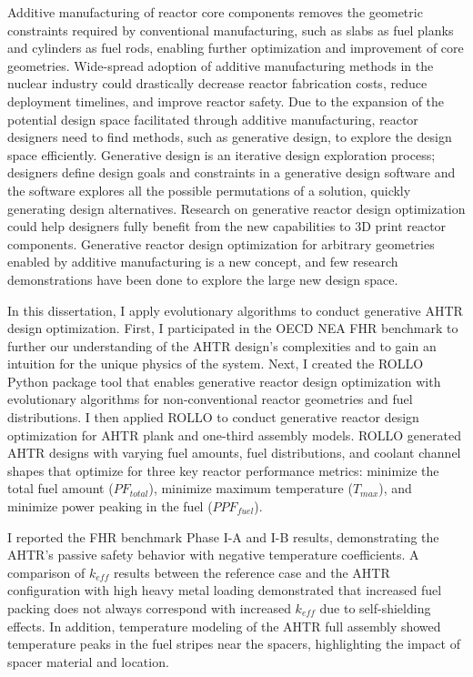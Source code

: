 

Additive manufacturing of reactor core components removes the geometric constraints
required by conventional manufacturing, such as slabs as fuel planks and cylinders 
as fuel rods, enabling further optimization and improvement of core geometries. 
Wide-spread adoption of additive manufacturing methods in the nuclear industry 
could drastically decrease reactor fabrication costs, reduce deployment timelines, 
and improve reactor safety. 
Due to the expansion of the potential design space facilitated through additive 
manufacturing, reactor designers need to find methods, such as generative 
design, to explore the design space efficiently.
Generative design is an iterative design exploration process; designers define design 
goals and constraints in a generative design software and the software explores 
all the possible permutations of a solution, quickly generating design alternatives. 
Research on generative reactor design optimization could help designers fully benefit 
from the new capabilities to 3D print reactor components. 
Generative reactor design optimization for arbitrary geometries enabled by additive 
manufacturing is a new concept, and few research demonstrations have been done to 
explore the large new design space. 

In this dissertation, I apply evolutionary algorithms to conduct generative \gls{AHTR} 
design optimization. 
First, I participated in the \gls{OECD} \gls{NEA} \gls{FHR} benchmark to further our 
understanding of the \gls{AHTR} design's complexities and to gain an intuition 
for the unique physics of the system.  
Next, I created the \gls{ROLLO} Python package tool that enables generative reactor 
design optimization with evolutionary algorithms for non-conventional reactor 
geometries and fuel distributions. 
I then applied \gls{ROLLO} to conduct generative reactor design optimization
for \gls{AHTR} plank and one-third assembly models.
\gls{ROLLO} generated \gls{AHTR} designs with varying fuel amounts, fuel 
distributions, and coolant channel shapes that optimize for three key reactor 
performance metrics: minimize the total fuel amount ($PF_{total}$), minimize maximum 
temperature ($T_{max}$), and minimize power peaking in the fuel ($PPF_{fuel}$).

I reported the \gls{FHR} benchmark Phase I-A and I-B results, demonstrating the 
\gls{AHTR}'s passive safety behavior with negative temperature coefficients.
A comparison of $k_{eff}$ results between the reference case and the \gls{AHTR} 
configuration with high heavy metal loading demonstrated that increased fuel 
packing does not always correspond with increased $k_{eff}$ due to self-shielding 
effects.
In addition, temperature modeling of the \gls{AHTR}  full assembly showed temperature 
peaks in the fuel stripes near the spacers, highlighting the impact of spacer material 
and location. 

